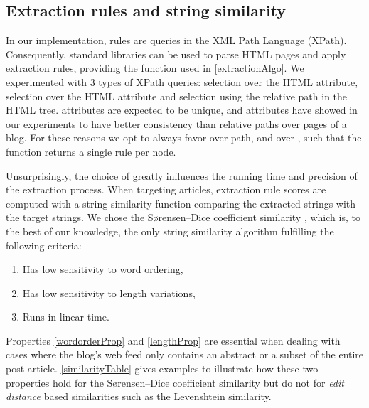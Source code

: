 \subsection{Extraction rules and string similarity}
\label{extractionrulesandstringsimilarity}

In our implementation, rules are queries in the XML Path Language (XPath). Consequently, standard libraries can be used to parse HTML pages and apply extraction rules, providing the  function used in \autoref{extractionAlgo}. We experimented with 3 types of XPath queries: selection over the HTML  attribute, selection over the HTML  attribute and selection using the relative path in the HTML tree.  attributes are expected to be unique, and  attributes have showed in our experiments to have better consistency than relative paths over pages of a blog. For these reasons we opt to always favor  over path, and  over , such that the  function returns a single rule per node.

\allrulesAlgo

Unsurprisingly, the choice of  greatly influences the running time and precision of the extraction process. When targeting articles, extraction rule scores are computed with a string similarity function comparing the extracted strings with the target strings. We chose the Sørensen–Dice coefficient similarity \cite{dice1945}, which is, to the best of our knowledge, the only string similarity algorithm fulfilling the following criteria:

\begin{enumerate}
  \item\label{wordorderProp} Has low sensitivity to word ordering,
  \item\label{lengthProp} Has low sensitivity to length variations,
  \item\label{linearProp} Runs in linear time.
\end{enumerate}

Properties \ref{wordorderProp} and \ref{lengthProp} are essential when dealing with cases where the blog's web feed only contains an abstract or a subset of the entire post article. \autoref{similarityTable} gives examples to illustrate how these two properties hold for the Sørensen–Dice coefficient similarity but do not for \emph{edit distance} based similarities such as the Levenshtein \cite{levenshtein1966} similarity.

